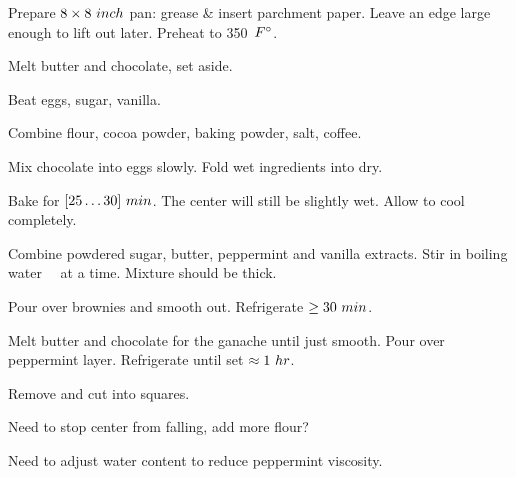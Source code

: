 \begin{preparation}
\item Prepare $8 \times 8~\inch$ pan: grease \& insert parchment paper.
    Leave an edge large enough to lift out later.
    Preheat to 350~$\Fahrenheit$.

\item Melt butter and chocolate, set aside.

\item Beat eggs, sugar, vanilla.

\item Combine flour, cocoa powder, baking powder, salt, coffee.

\item Mix chocolate into eggs slowly.
    Fold wet ingredients into dry.

\item Bake for $[25 \ldots 30]~\minute$.
    The center will still be slightly wet.
    Allow to cool completely.

\item Combine powdered sugar, butter, peppermint and vanilla extracts.
    Stir in boiling water \onehalf~\teaspoon~at a time.
    Mixture should be thick.

\item Pour over brownies and smooth out.
    Refrigerate $\ge 30~\minute$.

\item Melt butter and chocolate for the ganache until just smooth.
    Pour over peppermint layer.
    Refrigerate until set $\approx 1~\hour$.

\item Remove and cut into squares.
\end{preparation}

\begin{experiments}
\item Need to stop center from falling, add more flour?
\item Need to adjust water content to reduce peppermint viscosity.
\end{experiments}

\recipeend%
